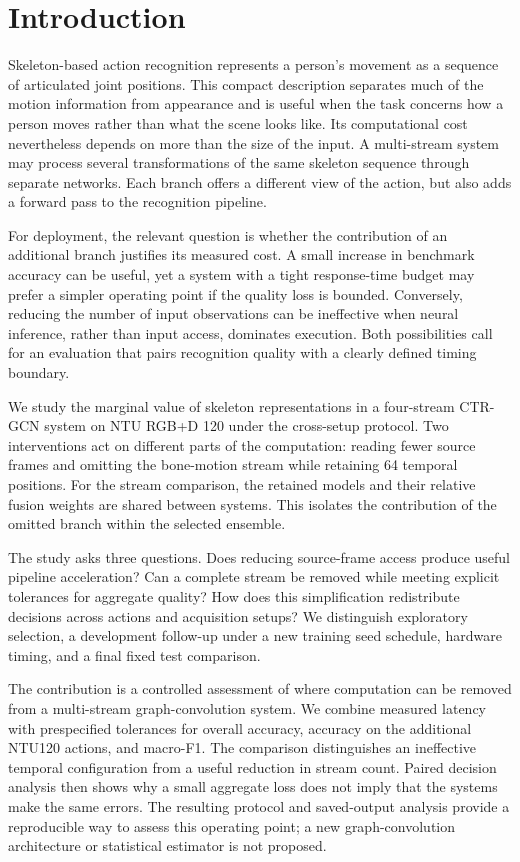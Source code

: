 \documentclass[ai,article,submit,moreauthors]{Definitions/mdpi}
\begin{document}
\section{Introduction}
Skeleton-based action recognition represents a person's movement as a sequence of articulated joint positions. This compact description separates much of the motion information from appearance and is useful when the task concerns how a person moves rather than what the scene looks like. Its computational cost nevertheless depends on more than the size of the input. A multi-stream system may process several transformations of the same skeleton sequence through separate networks. Each branch offers a different view of the action, but also adds a forward pass to the recognition pipeline.

For deployment, the relevant question is whether the contribution of an additional branch justifies its measured cost. A small increase in benchmark accuracy can be useful, yet a system with a tight response-time budget may prefer a simpler operating point if the quality loss is bounded. Conversely, reducing the number of input observations can be ineffective when neural inference, rather than input access, dominates execution. Both possibilities call for an evaluation that pairs recognition quality with a clearly defined timing boundary.

We study the marginal value of skeleton representations in a four-stream CTR-GCN system on NTU RGB+D 120 under the cross-setup protocol. Two interventions act on different parts of the computation: reading fewer source frames and omitting the bone-motion stream while retaining 64 temporal positions. For the stream comparison, the retained models and their relative fusion weights are shared between systems. This isolates the contribution of the omitted branch within the selected ensemble.

The study asks three questions. Does reducing source-frame access produce useful pipeline acceleration? Can a complete stream be removed while meeting explicit tolerances for aggregate quality? How does this simplification redistribute decisions across actions and acquisition setups? We distinguish exploratory selection, a development follow-up under a new training seed schedule, hardware timing, and a final fixed test comparison.

The contribution is a controlled assessment of where computation can be removed from a multi-stream graph-convolution system. We combine measured latency with prespecified tolerances for overall accuracy, accuracy on the additional NTU120 actions, and macro-F1. The comparison distinguishes an ineffective temporal configuration from a useful reduction in stream count. Paired decision analysis then shows why a small aggregate loss does not imply that the systems make the same errors. The resulting protocol and saved-output analysis provide a reproducible way to assess this operating point; a new graph-convolution architecture or statistical estimator is not proposed.
\end{document}
